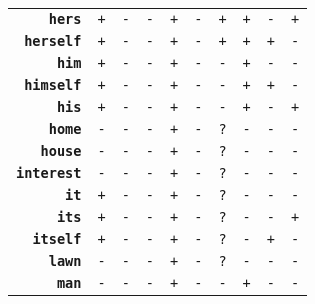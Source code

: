 \documentclass{article}
\begin{document}
\begin{minipage}{\textwidth}
{\begin{tabular}{|r|c|c|c|c|c|c|c|c|c|}
    \textbf{\texttt{hers}} & \texttt{+}
    & \texttt{-} & \texttt{-}
    & \texttt{+} & \texttt{-}
    & \texttt{+} & \texttt{+}
    & \texttt{-} & \texttt{+} \\
    \textbf{\texttt{herself}} & \texttt{+}
    & \texttt{-} & \texttt{-}
    & \texttt{+} & \texttt{-}
    & \texttt{+} & \texttt{+}
    & \texttt{+} & \texttt{-} \\
    \textbf{\texttt{him}} & \texttt{+}
    & \texttt{-} & \texttt{-}
    & \texttt{+} & \texttt{-}
    & \texttt{-} & \texttt{+}
    & \texttt{-} & \texttt{-} \\
    \textbf{\texttt{himself}} & \texttt{+}
    & \texttt{-} & \texttt{-}
    & \texttt{+} & \texttt{-}
    & \texttt{-} & \texttt{+}
    & \texttt{+} & \texttt{-} \\
    \textbf{\texttt{his}} & \texttt{+}
    & \texttt{-} & \texttt{-}
    & \texttt{+} & \texttt{-}
    & \texttt{-} & \texttt{+}
    & \texttt{-} & \texttt{+} \\
    \textbf{\texttt{home}} & \texttt{-}
    & \texttt{-} & \texttt{-}
    & \texttt{+} & \texttt{-}
    & \texttt{?} & \texttt{-}
    & \texttt{-} & \texttt{-} \\
    \textbf{\texttt{house}} & \texttt{-}
    & \texttt{-} & \texttt{-}
    & \texttt{+} & \texttt{-}
    & \texttt{?} & \texttt{-}
    & \texttt{-} & \texttt{-} \\
    \textbf{\texttt{interest}} & \texttt{-}
    & \texttt{-} & \texttt{-}
    & \texttt{+} & \texttt{-}
    & \texttt{?} & \texttt{-}
    & \texttt{-} & \texttt{-} \\
    \textbf{\texttt{it}} & \texttt{+}
    & \texttt{-} & \texttt{-}
    & \texttt{+} & \texttt{-}
    & \texttt{?} & \texttt{-}
    & \texttt{-} & \texttt{-} \\
    \textbf{\texttt{its}} & \texttt{+}
    & \texttt{-} & \texttt{-}
    & \texttt{+} & \texttt{-}
    & \texttt{?} & \texttt{-}
    & \texttt{-} & \texttt{+} \\
    \textbf{\texttt{itself}} & \texttt{+}
    & \texttt{-} & \texttt{-}
    & \texttt{+} & \texttt{-}
    & \texttt{?} & \texttt{-}
    & \texttt{+} & \texttt{-} \\
    \textbf{\texttt{lawn}} & \texttt{-}
    & \texttt{-} & \texttt{-}
    & \texttt{+} & \texttt{-}
    & \texttt{?} & \texttt{-}
    & \texttt{-} & \texttt{-} \\
    \textbf{\texttt{man}} & \texttt{-}
    & \texttt{-} & \texttt{-}
    & \texttt{+} & \texttt{-}
    & \texttt{-} & \texttt{+}
    & \texttt{-} & \texttt{-} \\

\end{tabular}}
\end{minipage}
\end{document}
